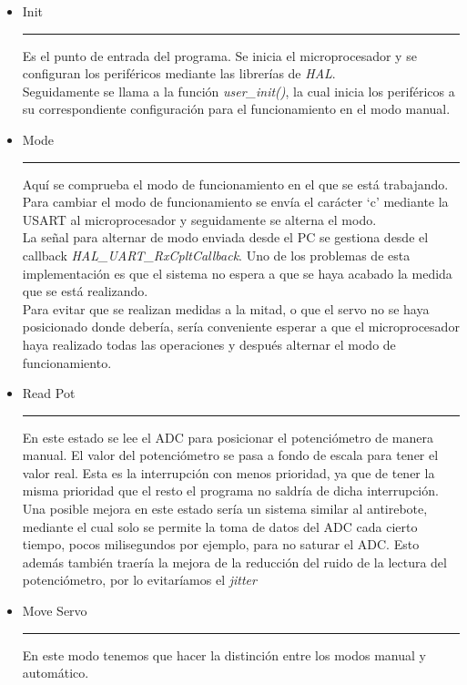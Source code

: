 \documentclass[a4paper, 12pt]{article}
\newcommand{\sangria}{\hspace*{1em}}
\newcommand{\Estado}[1]{
  \item[] {\Large {#1}\\ \rule{8em}{0.5pt} }
}
\begin{document}
 \begin{itemize}

   \newpage
\Estado{Init}
  
  \sangria{} Es el punto de entrada del programa. Se inicia el microprocesador y se configuran los periféricos mediante las librerías de \textit{HAL}.\\
  Seguidamente se llama a la función \textit{user\_init()}, la cual inicia los periféricos a su correspondiente configuración para el funcionamiento en el modo manual. 

\vspace*{2em} 
\Estado{Mode}
  
  \sangria{} Aquí se comprueba el modo de funcionamiento en el que se está trabajando. Para cambiar el modo de funcionamiento se envía el carácter `c' mediante la USART al microprocesador y seguidamente se alterna el modo.\\

  \sangria{} La señal para alternar de modo enviada desde el PC se gestiona desde el callback \textit{HAL\_UART\_RxCpltCallback}. Uno de los problemas de esta implementación es que el sistema no espera a que se haya acabado la medida que se está realizando.\\ Para evitar que se realizan medidas a la mitad, o que el servo no se haya posicionado donde debería, sería conveniente esperar a que el microprocesador haya realizado todas las operaciones y después alternar el modo de funcionamiento.

\vspace*{2em} 
\Estado{Read Pot}
  
  \sangria{} En este estado se lee el ADC para posicionar el potenciómetro de manera manual. El valor del potenciómetro se pasa a fondo de escala para tener el valor real.
  Esta es la interrupción con menos prioridad, ya que de tener la misma prioridad que el resto el programa no saldría de dicha interrupción.\\
  
Una posible mejora en este estado sería un sistema similar al antirebote, mediante el cual solo se permite la toma de datos del ADC cada cierto tiempo, pocos milisegundos por ejemplo, para no saturar el ADC. Esto además también traería la mejora de la reducción del ruido de la lectura del potenciómetro, por lo evitaríamos el \textit{jitter}

\vspace*{2em}
\Estado{Move Servo}

  \sangria{} En este modo tenemos que hacer la distinción entre los modos manual y automático.\\


\end{itemize}
\end{document}
